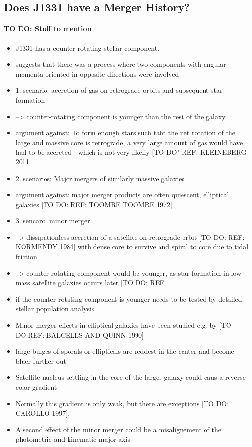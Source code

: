 \subsection{Does J1331 have a Merger History?}

\paragraph{TO DO: Stuff to mention}
\begin{itemize}
\item J1331 has a counter-rotating stellar component.
\item suggests that there was a process where two components with angular momenta oriented in opposite directions were involved
\item 1. scenario: accretion of gas on retrograde orbits and subsequent star formation
\item --> counter-rotating component is younger than the rest of the galaxy
\item argument against: To form enough stars such taht the net rotation of the large and massive core is retrograde, a very large amount of gas would have had to be accreted - which is not very likeliy [TO DO" REF: KLEINEBERG 2011] 
\item 2. scenarios: Major mergers of similarly massive galaxies
\item argument against: major merger products are often quiescent, elliptical galaxies [TO DO: REF: TOOMRE TOOMRE 1972]
\item 3. sencaro: minor merger
\item --> dissipationless accretion of a satellite on retrograde orbit [TO DO: REF: KORMENDY 1984] with dense core to survive and spiral to core due to tidal friction
\item --> counter-rotating component would be younger, as star formation in low-mass satellite galaxies occurs later [TO DO: REF]
\item if the counter-rotating component is younger needs to be tested by detailed stellar population analysis
\item Minor merger effects in elliptical galaxies have been studied e.g. by [TO DO:REF: BALCELLS AND QUINN 1990]
\item large bulges of sporals or ellipticals are reddest in the center and become bluer further out
\item Satellite nucleus settling in the core of the larger galaxy could caus a reverse color gradient
\item Normally this gradient is only weak, but there are exceptions [TO DO: CAROLLO 1997].
\item A second effect of the minor merger could be a misalignement of the photometric and kinematic major axis
\end{itemize}

